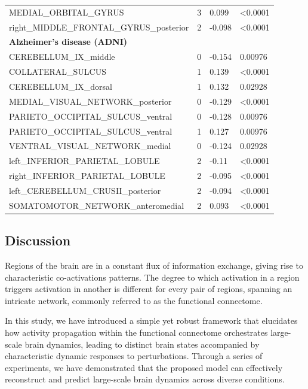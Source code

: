 \documentclass{article}
\begin{document}
\begin{tabular}{p{}p{}p{}p{}}
MEDIAL\_ORBITAL\_GYRUS & 3 & 0.099 & \textless 0.0001 \\
right\_MIDDLE\_FRONTAL\_GYRUS\_posterior & 2 & -0.098 & \textless 0.0001 \\
\newline
 \textbf{Alzheimer's disease (ADNI)} &  &  &  \\
CEREBELLUM\_IX\_middle & 0 & -0.154 & 0.00976 \\
COLLATERAL\_SULCUS & 1 & 0.139 & \textless 0.0001 \\
CEREBELLUM\_IX\_dorsal & 1 & 0.132 & 0.02928 \\
MEDIAL\_VISUAL\_NETWORK\_posterior & 0 & -0.129 & \textless 0.0001 \\
PARIETO\_OCCIPITAL\_SULCUS\_ventral & 0 & -0.128 & 0.00976 \\
PARIETO\_OCCIPITAL\_SULCUS\_ventral & 1 & 0.127 & 0.00976 \\
VENTRAL\_VISUAL\_NETWORK\_medial & 0 & -0.124 & 0.02928 \\
left\_INFERIOR\_PARIETAL\_LOBULE & 2 & -0.11 & \textless 0.0001 \\
right\_INFERIOR\_PARIETAL\_LOBULE & 2 & -0.095 & \textless 0.0001 \\
left\_CEREBELLUM\_CRUSII\_posterior & 2 & -0.094 & \textless 0.0001 \\
SOMATOMOTOR\_NETWORK\_anteromedial & 2 & 0.093 & \textless 0.0001 \\
\bottomrule
\end{tabular}

\subsection{Discussion}\label{Discussion}

Regions of the brain are in a constant flux of information exchange, giving rise to characteristic co-activations patterns.
The degree to which activation in a region triggers activation in another is different for every pair of regions, spanning an
intricate network, commonly referred to as the functional connectome.

In this study, we have introduced a simple yet robust framework that elucidates how activity propagation within the functional connectome orchestrates large-scale brain dynamics, leading to distinct brain states accompanied by characteristic dynamic responses to perturbations.
Through a series of experiments, we have demonstrated that the proposed model can effectively reconstruct and predict large-scale brain dynamics across diverse conditions.
\end{document}
